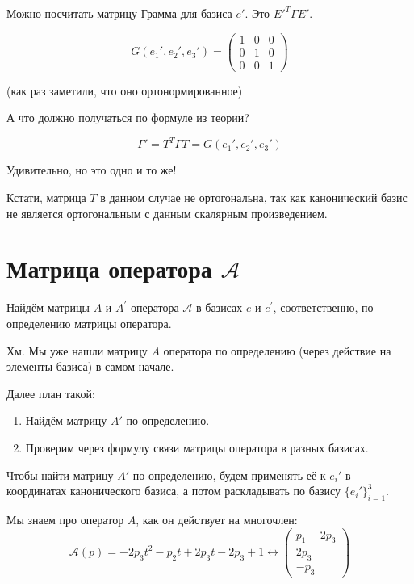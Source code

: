 \documentclass[12pt, a4paper]{article}
\begin{document}
    Можно посчитать матрицу Грамма для базиса $e'$. Это $E'^{T} \Gamma E'$.

    \begin{equation}
        G(e_1', e_2', e_3') = \left(\begin{matrix}
            1 & 0 & 0 \\
            0 & 1 & 0 \\
            0 & 0 & 1
        \end{matrix}\right)
    \end{equation}

    (как раз заметили, что оно ортонормированное)

    А что должно получаться по формуле из теории?

    \begin{equation}
        \Gamma' = T^{T} \Gamma T = G(e_1', e_2', e_3')
    \end{equation}

    Удивительно, но это одно и то же!

    Кстати, матрица $T$ в данном случае не ортогональна, так как канонический базис 
    не является ортогональным с данным скалярным произведением.



    \section{Матрица оператора $\mathcal{A}$}

    Найдём матрицы $A$ и $A^{\prime}$ оператора $\mathcal{A}$ 
    в базисах $e$ и $e^{\prime}$, соответственно, по определению матрицы оператора.

    Хм. Мы уже нашли матрицу $A$ оператора по определению (через действие на элементы базиса) 
    в самом начале.

    Далее план такой:
    \begin{enumerate}
        \item Найдём матрицу $A'$ по определению.
        \item Проверим через формулу связи матрицы оператора в разных базисах.
    \end{enumerate}

    Чтобы найти матрицу $A'$ по определению, 
    будем применять её к $e_i'$ в координатах канонического базиса, 
    а потом раскладывать по базису $\{ e_i' \}_{i = 1}^3$.

    Мы знаем про оператор $A$, как он действует на многочлен:
    \begin{equation}
        \mathcal{A}(p) = -2 p_3 t^2 - p_2 t + 2 p_3 t - 2 p_3 + 1 \leftrightarrow \begin{pmatrix}
            p_1 - 2 p_3 \\
            2 p_3 \\
            - p_3
         \end{pmatrix}
    \end{equation}
\end{document}
